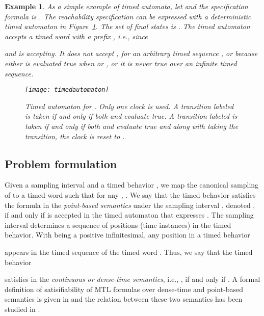 \documentclass[letterpaper, 10 pt, conference]{ieeeconf}
\newtheorem{example}{Example}
\begin{document}
\begin{example}
As a simple example of timed automata, let  and 
the specification formula is . The
reachability specification can be expressed with a deterministic timed
automaton  in Figure~\ref{fig:reach}. The set of final
states is .  The timed automaton accepts a timed word with
a prefix , i.e.,
 since

and  is accepting. It does not accept
,
 for an arbitrary timed sequence
, or  because either 
is evaluated true when  or , or it is never true over an
infinite timed sequence.
\begin{figure}[h]
\centering
\texttt{[image: timedautomaton]}
\caption{Timed automaton  for
  . Only one clock  is used. A
  transition labeled  is taken if and only if both
   and  evaluate true. A transition labeled
   is taken if and only if both  and
   evaluate true and along with taking the transition, the
  clock  is reset to .}
\label{fig:reach}
\end{figure}
\end{example}














\subsection{Problem formulation}
Given a sampling interval  and a timed behavior
, we map the canonical sampling
 of  to a timed word
 such
that for any , . We say that the timed
behavior  satisfies the formula  in the \emph{point-based
  semantics} under the sampling interval , denoted
, if and only if  is
accepted in the timed automaton  that expresses
. The sampling interval 
determines a sequence of positions (time instances)  in the timed behavior. With  being a positive infinitesimal, any position in a timed behavior

appears in the timed sequence of the timed word . Thus, we say that the timed behavior

satisfies 
in the \emph{continuous or dense-time semantics}, i.e., , if and only if . A formal definition of satisifiability of MTL
formulas over dense-time and point-based semantics is given in
\cite{Bouyer2009} and the relation between these two semantics has
been studied in \cite{Furia2006}.
\end{document}
